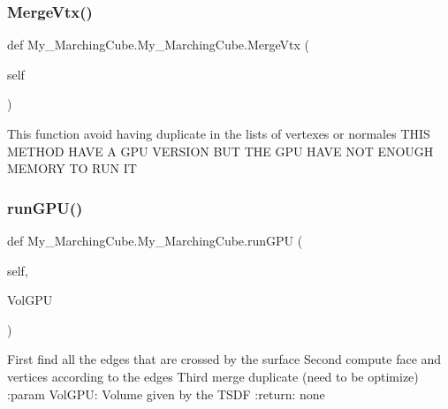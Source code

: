 \subsubsection{\texorpdfstring{Merge\+Vtx()}{MergeVtx()}}
{\footnotesize\ttfamily def My\+\_\+\+Marching\+Cube.\+My\+\_\+\+Marching\+Cube.\+Merge\+Vtx (\begin{DoxyParamCaption}\item[{}]{self }\end{DoxyParamCaption})}

\begin{DoxyVerb}This function avoid having duplicate in the lists of vertexes or normales
THIS METHOD HAVE A GPU VERSION BUT THE GPU HAVE NOT ENOUGH MEMORY TO RUN IT
\end{DoxyVerb}
 \mbox{\label{class_my___marching_cube_1_1_my___marching_cube_a820edf1a7b295d5e3fbe858bddc03423}} 
\subsubsection{\texorpdfstring{run\+G\+P\+U()}{runGPU()}}
{\footnotesize\ttfamily def My\+\_\+\+Marching\+Cube.\+My\+\_\+\+Marching\+Cube.\+run\+G\+PU (\begin{DoxyParamCaption}\item[{}]{self,  }\item[{}]{Vol\+G\+PU }\end{DoxyParamCaption})}

\begin{DoxyVerb}First find all the edges that are crossed by the surface
Second compute face and vertices according to the edges
Third merge duplicate (need to be optimize)
:param VolGPU: Volume given by the TSDF
:return: none
\end{DoxyVerb}
 \mbox{\label{class_my___marching_cube_1_1_my___marching_cube_a9ba8a5429eed6fbbe83798c4988e65f4}} 

